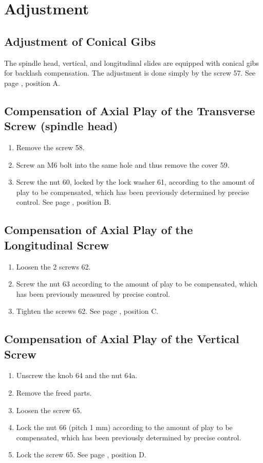\chapter{Adjustment}\label{chap:adjustment}

\section*{Adjustment of Conical Gibs}

The spindle head, vertical, and longitudinal slides are equipped with conical gibs for backlash compensation. The adjustment is done simply by the screw 57. See page \pageref{fig:handwheel_bearings}, position A.

\section*{Compensation of Axial Play of the Transverse Screw (spindle head)}

\begin{enumerate}
    \item Remove the screw 58.
    \item Screw an M6 bolt into the same hole and thus remove the cover 59.
    \item Screw the nut 60, locked by the lock washer 61, according to the amount of play to be compensated, which has been previously determined by precise control. See page \pageref{fig:handwheel_bearings}, position B.
\end{enumerate}

\section*{Compensation of Axial Play of the Longitudinal Screw}

\begin{enumerate}
    \item Loosen the 2 screws 62.
    \item Screw the nut 63 according to the amount of play to be compensated, which has been previously measured by precise control.
    \item Tighten the screws 62.
    See page \pageref{fig:handwheel_bearings}, position C.
\end{enumerate}

\section*{Compensation of Axial Play of the Vertical Screw}

\begin{enumerate}
    \item Unscrew the knob 64 and the nut 64a.
    \item Remove the freed parts.
    \item Loosen the screw 65.
    \item Lock the nut 66 (pitch 1 mm) according to the amount of play to be compensated, which has been previously determined by precise control.
    \item Lock the screw 65.
    See page \pageref{fig:handwheel_bearings}, position D.
\end{enumerate}

